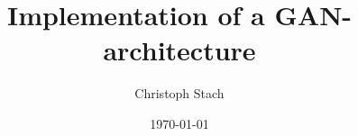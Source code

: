 


\title{Implementation of a GAN-architecture}
\author{Christoph Stach}

\date{\today}












